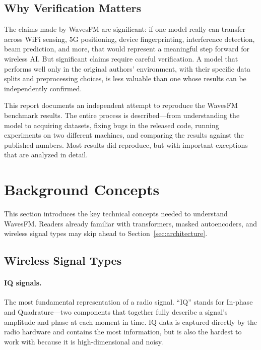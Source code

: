 \documentclass[11pt]{article}
\begin{document}
\subsection{Why Verification Matters}

The claims made by WavesFM are significant: if one model really can transfer across WiFi sensing, 5G positioning, device fingerprinting, interference detection, beam prediction, and more, that would represent a meaningful step forward for wireless AI. But significant claims require careful verification. A model that performs well only in the original authors' environment, with their specific data splits and preprocessing choices, is less valuable than one whose results can be independently confirmed.

This report documents an independent attempt to reproduce the WavesFM benchmark results. The entire process is described---from understanding the model to acquiring datasets, fixing bugs in the released code, running experiments on two different machines, and comparing the results against the published numbers. Most results did reproduce, but with important exceptions that are analyzed in detail.

\section{Background Concepts}
\label{sec:background}

This section introduces the key technical concepts needed to understand WavesFM. Readers already familiar with transformers, masked autoencoders, and wireless signal types may skip ahead to Section~\ref{sec:architecture}.

\subsection{Wireless Signal Types}

\paragraph{IQ signals.} The most fundamental representation of a radio signal. ``IQ'' stands for In-phase and Quadrature---two components that together fully describe a signal's amplitude and phase at each moment in time. IQ data is captured directly by the radio hardware and contains the most information, but is also the hardest to work with because it is high-dimensional and noisy.
\end{document}
